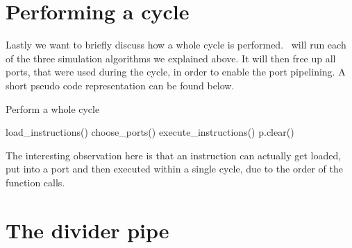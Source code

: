 \section{Performing a cycle}

Lastly we want to briefly discuss how a whole cycle is performed. \suaca\ will run each of the three simulation algorithms we explained above. It will then free up all ports, that were used during the cycle, in order to enable the port pipelining. A short pseudo code representation can be found below.

\begin{algorithm}[H]
    \SetAlgoLined
    \caption{Perform a whole cycle}
    load\_instructions()\;
    choose\_ports()\;
    execute\_instructions()\;
     {
        p.clear()\;
    }
\end{algorithm}

The interesting observation here is that an instruction can actually get loaded, put into a port and then executed within a single cycle, due to the order of the function calls.


\section{The divider pipe}
\label{sec:dividerpipe}
